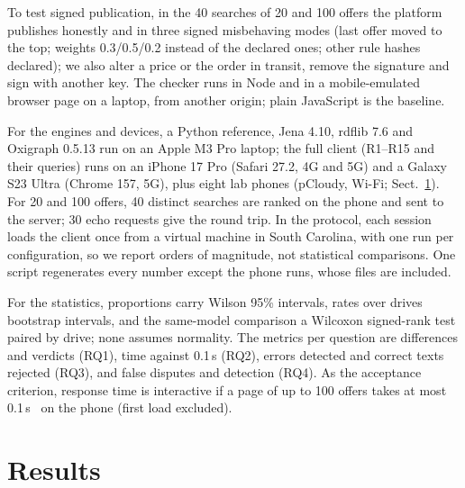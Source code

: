\documentclass{svproc}
\begin{document}
To test signed publication, in the 40 searches of 20 and 100 offers the platform publishes honestly and in three signed misbehaving modes (last offer moved to the top; weights 0.3/0.5/0.2 instead of the declared ones; other rule hashes declared); we also alter a price or the order in transit, remove the signature and sign with another key. The checker runs in Node and in a mobile-emulated browser page on a laptop, from another origin; plain JavaScript is the baseline.

For the engines and devices, a Python reference, Jena 4.10, rdflib 7.6 and Oxigraph 0.5.13 run on an Apple M3 Pro laptop; the full client (R1--R15 and their queries) runs on an iPhone 17 Pro (Safari 27.2, 4G and 5G) and a Galaxy S23 Ultra (Chrome 157, 5G), plus eight lab phones (pCloudy, Wi-Fi; Sect.~\ref{sec:res}). For 20 and 100 offers, 40 distinct searches are ranked on the phone and sent to the server; 30 echo requests give the round trip. In the protocol, each session loads the client once from a virtual machine in South Carolina, with one run per configuration, so we report orders of magnitude, not statistical comparisons. One script regenerates every number except the phone runs, whose files are included.

For the statistics, proportions carry Wilson 95\% intervals, rates over drives bootstrap intervals, and the same-model comparison a Wilcoxon signed-rank test paired by drive; none assumes normality. The metrics per question are differences and verdicts (RQ1), time against 0.1\,s (RQ2), errors detected and correct texts rejected (RQ3), and false disputes and detection (RQ4). As the acceptance criterion, response time is interactive if a page of up to 100 offers takes at most 0.1\,s~\cite{nielsen1993} on the phone (first load excluded).

\section{Results}\label{sec:res}
\end{document}
